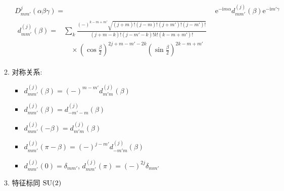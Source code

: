 \documentclass[12pt,a4paper]{article}%
\numberwithin{equation}{section}%
\newcommand\mi{\mathrm{i}}
\newcommand\e{\mathrm{e}}%
\begin{document}
\begin{enumerate}
\begin{enumerate}
		\begin{align}
			D_{mm'}^j(\alpha\beta\gamma) =& \e^{-\mi m\alpha}d_{mm'}^{(j)}(\beta)\e^{-\mi m'\gamma} \\
			\begin{split}
				d_{mm'}^{(j)}(\beta) =& \sum_k\frac{(-)^{k-m+m'}\sqrt{(j+m)!(j-m)!(j+m')!(j-m')!}}{(j+m-k)!(j-m'-k)!k!(k-m+m')!}\\
				&\quad\times\left(\cos\frac\beta 2\right)^{2j+m-m'-2k}\left(\sin\frac\beta 2\right)^{2k-m+m'}
			\end{split}
		\end{align}
		\item 对称关系: 
		\begin{itemize}
			\item $d^{(j)}_{mm'}(\beta) = (-)^{m-m'}d_{m'm}^{(j)}(\beta)$
			\item $d_{mm'}^{(j)}(\beta) = d_{-m'-m}^{(j)}(\beta)$
			\item $d_{mm'}^{(j)}(-\beta) = d_{m'm}^{(j)}(\beta)$
			\item $d_{mm'}^{(j)}(\pi-\beta) = (-)^{j-m'}d_{-m'm}^{(j)}(\beta)$
			\item $d_{mm'}^{(j)}(0) = \delta_{mm'}$, $d_{mm'}^{(j)}(\pi) = (-)^{2j}\delta_{mm'}$
		\end{itemize}
		\item 特征标同 $\mathrm{SU}(2)$
	\end{enumerate}
\end{enumerate}
\end{document}
